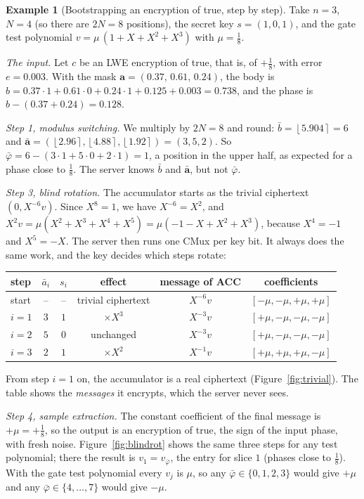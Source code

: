 \documentclass[12pt]{article}
\theoremstyle{plain}
\theoremstyle{definition}
\newtheorem{example}{Example}
\newcommand{\round}[1]{\left\lfloor #1 \right\rceil}
\begin{document}
\begin{example}[Bootstrapping an encryption of \textsf{true}, step by step]
\label{ex:blindrot}
Take $n=3$, $N=4$ (so there are $2N=8$ positions), the secret key $s=(1,0,1)$,
and the gate test polynomial $v=\mu\,(1+X+X^2+X^3)$ with $\mu=\frac18$.

\emph{The input.} Let $c$ be an LWE encryption of \textsf{true}, that is, of
$+\frac18$, with error $e=0.003$. With the mask $\mathbf a=(0.37,\,0.61,\,0.24)$,
the body is $b=0.37\cdot1+0.61\cdot0+0.24\cdot1+0.125+0.003=0.738$, and the
phase is $b-(0.37+0.24)=0.128$.

\emph{Step 1, modulus switching.} We multiply by $2N=8$ and round:
$\bar b=\round{5.904}=6$ and
$\bar{\mathbf a}=(\round{2.96},\round{4.88},\round{1.92})=(3,5,2)$. So
$\bar\varphi=6-(3\cdot1+5\cdot0+2\cdot1)=1$, a position in the upper half, as
expected for a phase close to $\frac18$. The server knows $\bar b$ and
$\bar{\mathbf a}$, but not $\bar\varphi$.

\emph{Step 3, blind rotation.} The accumulator starts as the trivial ciphertext
$(0,X^{-6}v)$. Since $X^8=1$, we have $X^{-6}=X^{2}$, and
$X^2v=\mu(X^2+X^3+X^4+X^5)=\mu(-1-X+X^2+X^3)$, because $X^4=-1$ and $X^5=-X$.
The server then runs one CMux per key bit. It always does the same work, and
the key decides which steps rotate:
\begin{center}
\small
\begin{tabular}{@{}lccccc@{}}
\toprule
step & $\bar a_i$ & $s_i$ & effect & message of ACC & coefficients\\
\midrule
start & -- & -- & trivial ciphertext & $X^{-6}v$ & $[-\mu,-\mu,+\mu,+\mu]$\\
$i=1$ & $3$ & $1$ & $\times X^{3}$ & $X^{-3}v$ & $[+\mu,-\mu,-\mu,-\mu]$\\
$i=2$ & $5$ & $0$ & unchanged & $X^{-3}v$ & $[+\mu,-\mu,-\mu,-\mu]$\\
$i=3$ & $2$ & $1$ & $\times X^{2}$ & $X^{-1}v$ & $[+\mu,+\mu,+\mu,-\mu]$\\
\bottomrule
\end{tabular}
\end{center}
From step $i=1$ on, the accumulator is a real ciphertext
(Figure~\ref{fig:trivial}). The table shows the \emph{messages} it encrypts,
which the server never sees.

\emph{Step 4, sample extraction.} The constant coefficient of the final message
is $+\mu=+\frac18$, so the output is an encryption of \textsf{true}, the sign of
the input phase, with fresh noise. Figure~\ref{fig:blindrot} shows the same
three steps for any test polynomial; there the result is $v_1=v_{\bar\varphi}$,
the entry for slice $1$ (phases close to $\frac18$). With the gate test
polynomial every $v_j$ is $\mu$, so any $\bar\varphi\in\{0,1,2,3\}$ would give
$+\mu$ and any $\bar\varphi\in\{4,\dots,7\}$ would give $-\mu$.
\end{example}
\end{document}
